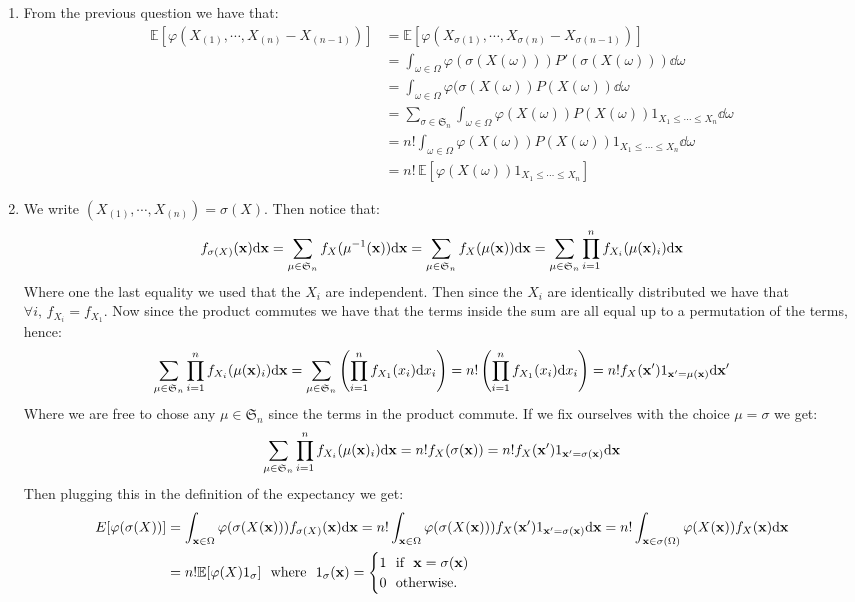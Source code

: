 \documentclass[10pt,a4paper]{article}
\begin{document}
\begin{enumerate}
\item From the previous question we have that:
\begin{align*}
\mathbb{E}[\varphi(X_{(1)}, \cdots, X_{(n)} - X_{(n-1)})] &= \mathbb{E}[\varphi(X_{\sigma(1)}, \cdots, X_{\sigma(n)} - X_{\sigma(n-1)})]\\
&= \int_{\omega \in \Omega} \varphi(\sigma(X(\omega))) P'(\sigma(X(\omega)))  \dd \omega \\
&= \int_{\omega \in \Omega} \varphi(\sigma(X(\omega)) P(X(\omega)) \dd \omega \\
&= \sum_{\sigma \in \mathfrak{S}_n} \int_{\omega \in \Omega} \varphi(X(\omega)) P(X(\omega)) 1_{X_1 \leq \cdots \leq X_n} \dd \omega \\
&= n! \int_{\omega \in \Omega} \varphi(X(\omega)) P(X(\omega)) 1_{X_1 \leq \cdots \leq X_n} \dd \omega \\
&= n!\, \mathbb{E}[\varphi(X(\omega)) 1_{X_1 \leq \cdots \leq X_n}]
\end{align*}

\item We write $(X_{(1)}, \cdots, X_{(n)}) = \sigma(X)$. Then notice that:
\[
f_{\sigma(X)}(\vb{x}) \dd \vb{x} = \sum_{\mu \in \mathfrak{S}_n} f_X(\mu^{-1}(\vb{x})) \dd \vb{x} = \sum_{\mu \in \mathfrak{S}_n} f_X(\mu(\vb{x})) \dd \vb{x} = \sum_{\mu \in \mathfrak{S}_n} \prod_{i = 1}^n f_{X_i}(\mu(\vb{x})_i) \dd \vb{x}
\]
Where one the last equality we used that the $X_i$ are independent. Then since the $X_i$ are identically distributed we have that $\forall i, \, f_{X_i} = f_{X_1}$. Now since the product commutes we have that the terms inside the sum are all equal up to a permutation of the terms, hence:
\[
\sum_{\mu \in \mathfrak{S}_n} \prod_{i = 1}^n f_{X_i}(\mu(\vb{x})_i) \dd \vb{x} = \sum_{\mu \in \mathfrak{S}_n} \left( \prod_{i = 1}^n f_{X_1}(x_i) \dd x_i \right) = n!\left( \prod_{i = 1}^n f_{X_1}(x_i) \dd x_i \right) = n! f_X(\vb{x'}) 1_{\vb{x'} = \mu(\vb{x})} \dd \vb{x'}
\]
Where we are free to chose any $\mu \in \mathfrak{S}_n$ since the terms in the product commute. If we fix ourselves with the choice $\mu = \sigma$ we get:
\[
\sum_{\mu \in \mathfrak{S}_n} \prod_{i = 1}^n f_{X_i}(\mu(\vb{x})_i) \dd \vb{x} = n! f_X(\sigma(\vb{x})) = n! f_X(\vb{x'}) 1_{\vb{x'} = \sigma(\vb{x})} \dd \vb{x}
\]
Then plugging this in the definition of the expectancy we get:
\begin{align*}
E[\varphi(\sigma(X))] &= \int_{\vb{x} \in \Omega} \varphi(\sigma(X(\vb{x}))) f_{\sigma(X)}(\vb{x}) \dd \vb{x} = n! \int_{\vb{x} \in \Omega} \varphi(\sigma(X(\vb{x}))) f_{X}(\vb{x'}) 1_{\vb{x'} = \sigma(\vb{x})} \dd \vb{x} = n! \int_{\vb{x} \in \sigma(\Omega)} \varphi(X(\vb{x})) f_{X}(\vb{x}) \dd \vb{x}\\
&= n! \mathbb{E}[\varphi(X) 1_{\sigma}] \mbox{~~where~~} 1_\sigma(\vb{x}) = \begin{cases}
1 \mbox{~~if~~} \vb{x} = \sigma(\vb{x})\\
0 \mbox{~~otherwise.}
\end{cases}
\end{align*}


\end{enumerate}
\end{document}
